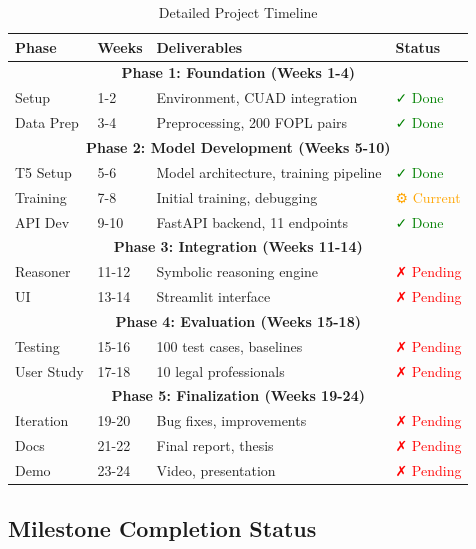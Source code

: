 \documentclass[12pt,a4paper]{article}
\begin{document}
\begin{table}[H]
\centering
\small
\begin{tabular}{|l|l|p{6cm}|l|}
\hline
\textbf{Phase} & \textbf{Weeks} & \textbf{Deliverables} & \textbf{Status} \\
\hline
\multicolumn{4}{|c|}{\textbf{Phase 1: Foundation (Weeks 1-4)}} \\
\hline
Setup & 1-2 & Environment, CUAD integration & \textcolor{green}{✓ Done} \\
Data Prep & 3-4 & Preprocessing, 200 FOPL pairs & \textcolor{green}{✓ Done} \\
\hline
\multicolumn{4}{|c|}{\textbf{Phase 2: Model Development (Weeks 5-10)}} \\
\hline
T5 Setup & 5-6 & Model architecture, training pipeline & \textcolor{green}{✓ Done} \\
Training & 7-8 & Initial training, debugging & \textcolor{orange}{⚙ Current} \\
API Dev & 9-10 & FastAPI backend, 11 endpoints & \textcolor{green}{✓ Done} \\
\hline
\multicolumn{4}{|c|}{\textbf{Phase 3: Integration (Weeks 11-14)}} \\
\hline
Reasoner & 11-12 & Symbolic reasoning engine & \textcolor{red}{✗ Pending} \\
UI & 13-14 & Streamlit interface & \textcolor{red}{✗ Pending} \\
\hline
\multicolumn{4}{|c|}{\textbf{Phase 4: Evaluation (Weeks 15-18)}} \\
\hline
Testing & 15-16 & 100 test cases, baselines & \textcolor{red}{✗ Pending} \\
User Study & 17-18 & 10 legal professionals & \textcolor{red}{✗ Pending} \\
\hline
\multicolumn{4}{|c|}{\textbf{Phase 5: Finalization (Weeks 19-24)}} \\
\hline
Iteration & 19-20 & Bug fixes, improvements & \textcolor{red}{✗ Pending} \\
Docs & 21-22 & Final report, thesis & \textcolor{red}{✗ Pending} \\
Demo & 23-24 & Video, presentation & \textcolor{red}{✗ Pending} \\
\hline
\end{tabular}
\caption{Detailed Project Timeline}
\end{table}

\subsection{Milestone Completion Status}
\end{document}
